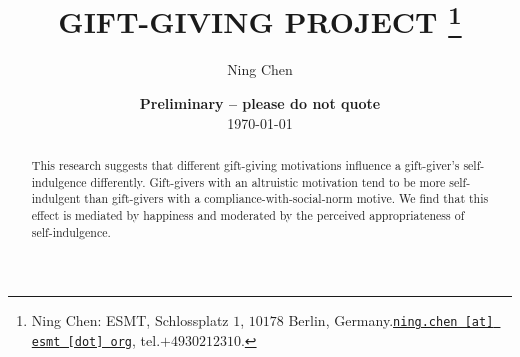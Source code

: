 \documentclass[11pt, a4paper, leqno]{article}
\begin{document}
\title{GIFT-GIVING PROJECT
\thanks{Ning Chen: ESMT, Schlossplatz $1$, $10178$ Berlin, Germany.\href{mailto:ning.chen@esmt.org} {\nolinkurl{ning.chen [at] esmt [dot] org}}, tel.$+49 30212310$.}
}

\author{Ning Chen
}

\date{
{\bf Preliminary -- please do not quote} 
\\[1ex] 
\today
}

\maketitle


\begin{abstract}
This research suggests that different gift-giving motivations influence a gift-giver’s self-indulgence differently. Gift-givers with an altruistic motivation tend to be more self-indulgent than gift-givers with a compliance-with-social-norm motive. We find that this effect is mediated by happiness and moderated by the perceived appropriateness of self-indulgence.
\end{abstract}
\clearpage
\end{document}
